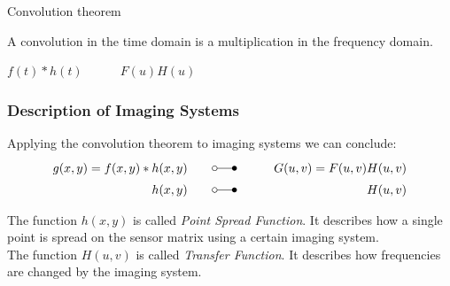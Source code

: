 \begin{frame}[c]{Convolution theorem}
    \begin{myDefinition}
        A convolution in the time domain is a multiplication in the frequency domain.\newline

        \begin{center}
            $f(t) \ast h(t)$ $\quad$ \laplace $\quad$ $F(u)H(u)$
        \end{center}
    \end{myDefinition}



\end{frame}

\begin{frame}
    \frametitle{Description of Imaging Systems}
    \begin{myDefinition}
        Applying the convolution theorem to imaging systems we can conclude:
        \begin{align*}
            \setlength{\jot}{32pt}
            g(x,y) = f(x,y) \ast h(x,y) \quad \quad & \laplace & \quad \quad  G(u,v)=F(u,v)H(u,v) \\
            h(x,y)            \quad \quad           & \laplace & \quad \quad  H(u,v)
        \end{align*}

        \vspace{5 mm}

        The function $h(x,y)$ is called \textit{Point Spread Function}. It describes how a single point is spread on the sensor matrix using a certain imaging system. \\[0.3cm]
        The function $H(u,v)$ is called \textit{Transfer Function}. It describes how frequencies are changed by the imaging system.
    \end{myDefinition}
\end{frame}


